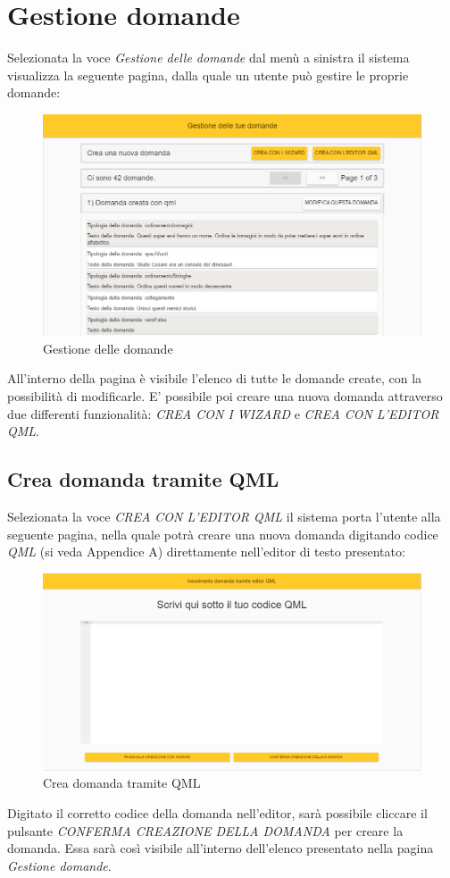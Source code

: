 \newpage
\section{Gestione domande}
Selezionata la voce \textit{Gestione delle domande} dal menù a sinistra il sistema visualizza la seguente pagina, dalla quale un utente può gestire le proprie domande:

\label{GestioneDomande}
\begin{figure}[ht]
	\centering
	\includegraphics[scale=0.45]{img/gestione_domande.png}
	\caption{Gestione delle domande}
\end{figure}
\FloatBarrier

All'interno della pagina è visibile l'elenco di tutte le domande create, con la possibilità di modificarle. E' possibile poi creare una nuova domanda attraverso due differenti funzionalità: \textit{CREA CON I WIZARD} e \textit{CREA CON L'EDITOR QML}.

\newpage
\subsection{Crea domanda tramite QML}
Selezionata la voce \textit{CREA CON L'EDITOR QML} il sistema porta l'utente alla seguente pagina, nella quale potrà creare una nuova domanda digitando codice \textit{QML} (si veda Appendice A) direttamente nell'editor di testo presentato:

\label{CreaDomandaQML}
\begin{figure}[ht]
	\centering
	\includegraphics[scale=0.40]{img/domanda_qml.png}
	\caption{Crea domanda tramite QML}
\end{figure}
\FloatBarrier

Digitato il corretto codice della domanda nell'editor, sarà possibile cliccare il pulsante \textit{CONFERMA CREAZIONE DELLA DOMANDA} per creare la domanda. Essa sarà così visibile all'interno dell'elenco presentato nella pagina \textit{Gestione domande}.